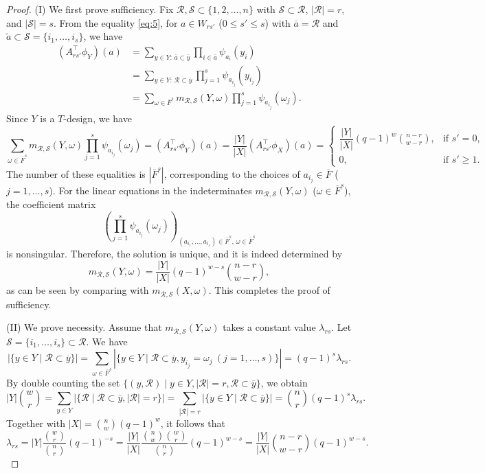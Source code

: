 \documentclass[10pt,a4paper]{amsart}
\begin{document}
\begin{proof}
(I) We first prove sufficiency.  
Fix $\mathcal{R}, \mathcal{S} \subset \{1,2,\ldots,n\}$ with $\mathcal{S} \subset \mathcal{R}$, $|\mathcal{R}| = r$, and $|\mathcal{S}| = s$.  
From the equality \eqref{eq:5}, for $a \in W_{rs'}$ ($0 \le s' \le s$) with $\overline{a} = \mathcal{R}$ and $\tilde{a} \subset \mathcal{S}=\{i_1,\ldots, i_s\}$, we have
\begin{align*}
    (A_{rs'}^\top \phi_Y)(a)
    &= \sum_{y \in Y:\, \overline{a} \subset \overline{y}} \prod_{i \in \overline{a}} \psi_{a_i}(y_i)\\
    &= \sum_{y \in Y:\, \mathcal{R} \subset \overline{y}} \prod_{j =1}^s \psi_{a_{i_j}}(y_{i_j})\\
    &= \sum_{\omega \in \overline{F}^{s}} m_{\mathcal{R},\mathcal{S}}(Y,\omega) 
       \prod_{j=1}^s \psi_{a_{i_j}}(\omega_j).
\end{align*}
Since $Y$ is a $T$-design, we have
\[
\sum_{\omega \in \overline{F}^{s}} 
   m_{\mathcal{R},\mathcal{S}}(Y,\omega) 
   \prod_{j=1}^s \psi_{a_{i_j}}(\omega_j)
   = (A_{rs'}^\top \phi_Y)(a)
   = \frac{|Y|}{|X|}(A_{rs'}^\top \phi_X)(a)
   = 
   \begin{cases}
      \dfrac{|Y|}{|X|}(q-1)^{w} \binom{n-r}{w-r}, & \text{if } s' = 0,\\[6pt]
      0, & \text{if } s' \ge 1.
   \end{cases}
\]
The number of these equalities is $|\overline{F}^{s}|$, corresponding to the choices of $a_{i_j} \in \overline{F}$ ($j=1,\ldots,s$).  
For the linear equations in the indeterminates $m_{\mathcal{R},\mathcal{S}}(Y,\omega)$ ($\omega \in \overline{F}^s$),  
the coefficient matrix 
\[
\left( \prod_{j=1}^s \psi_{a_{i_j}}(\omega_j) \right)_{(a_{i_1},\ldots,a_{i_s}) \in \overline{F}^s,\, \omega \in \overline{F}^s}
\]
is nonsingular.  
Therefore, the solution is unique, and it is indeed determined by
\[
m_{\mathcal{R},\mathcal{S}}(Y,\omega)
   = \frac{|Y|}{|X|}(q-1)^{w-s} \binom{n-r}{w-r},
\]
as can be seen by comparing with $m_{\mathcal{R},\mathcal{S}}(X,\omega)$.  
This completes the proof of sufficiency.


(II) We prove necessity. 
Assume that $m_{\mathcal{R},\mathcal{S}}(Y,\omega)$ takes a constant value $\lambda_{rs}$. 
Let $\mathcal{S}=\{i_1,\ldots, i_s\}\subset \mathcal{R}$. We have 
\[
 |\{y\in Y \mid  \mathcal{R}\subset \overline{y} \}|
 = \sum_{\omega \in \overline{F}^s}|\{y \in Y \mid  \mathcal{R} \subset \overline{y}, y_{i_j}=\omega_j\ (j=1,\ldots, s)\}|=(q-1)^s \lambda_{rs}. 
\]
By double counting the set $\{(y,\mathcal{R}) \mid  y \in Y, |\mathcal{R}|=r, \mathcal{R} \subset \overline{y}\}$, we obtain 
\[
|Y|\binom{w}{r}
=\sum_{y\in Y} |\{\mathcal{R} \mid \mathcal{R}\subset \overline{y}, |\mathcal{R}|=r  \}|
=\sum_{|\mathcal{R}|=r} |\{y\in Y \mid  \mathcal{R}\subset \overline{y} \}|
=\binom{n}{r}(q-1)^s\lambda_{rs}. 
\]
Together with $|X|=\binom{n}{w}(q-1)^w$, it follows that
\[
\lambda_{rs}=|Y|\frac{\binom{w}{r}}{\binom{n}{r}}(q-1)^{-s}
=\frac{|Y|}{|X|}\frac{\binom{n}{w}\binom{w}{r}}{\binom{n}{r}}(q-1)^{w-s}
=\frac{|Y|}{|X|}\binom{n-r}{w-r}(q-1)^{w-s}. 
\]


\end{proof}
\end{document}
